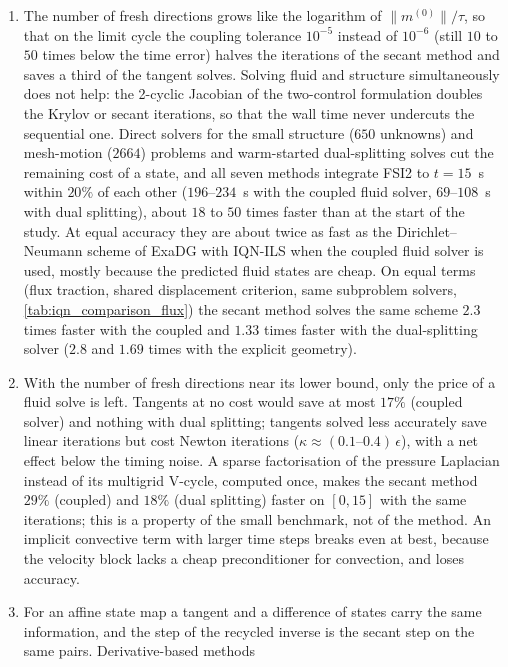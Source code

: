 \documentclass[11pt,a4paper]{article}
\theoremstyle{definition}
\theoremstyle{remark}
\begin{document}
\begin{enumerate}
remaining lever is the price of a direction, i.e.\ of the linear fluid solve of a tangent.
\item The number of fresh directions grows like the logarithm of $\|m^{(0)}\|/\tau$, so that on the
limit cycle the coupling tolerance $10^{-5}$ instead of $10^{-6}$ (still $10$ to $50$ times below
the time error) halves the iterations of the secant method and saves a third of the tangent
solves. Solving fluid and structure simultaneously does not help: the 2-cyclic Jacobian of the
two-control formulation doubles the Krylov or secant iterations, so that the wall time never
undercuts the sequential one. Direct solvers for the small structure ($650$ unknowns) and
mesh-motion ($2664$) problems and warm-started dual-splitting solves cut the remaining cost of a
state, and all seven methods integrate FSI2 to $t=15$~s within $20\%$ of each other ($196$--$234$~s
with the coupled fluid solver, $69$--$108$~s with dual splitting), about $18$ to $50$ times faster
than at the start of the study. At equal accuracy they are about twice as fast as the
Dirichlet--Neumann scheme of ExaDG with IQN-ILS when the coupled fluid solver is used, mostly
because the predicted fluid states are cheap. On equal terms (flux traction, shared displacement
criterion, same subproblem solvers, \cref{tab:iqn_comparison_flux}) the secant method solves the
same scheme $2.3$ times faster with the coupled and $1.33$ times faster with the dual-splitting
solver ($2.8$ and $1.69$ times with the explicit geometry).
\item With the number of fresh directions near its lower bound, only the price of a fluid solve is
left. Tangents at no cost would save at most $17\%$ (coupled solver) and nothing with dual
splitting; tangents solved less accurately save linear iterations but cost Newton iterations
($\kappa\approx(0.1\text{--}0.4)\,\epsilon$), with a net effect below the timing noise. A sparse
factorisation of the pressure Laplacian instead of its multigrid V-cycle, computed once, makes the
secant method $29\%$ (coupled) and $18\%$ (dual splitting) faster on $[0,15]$ with the same
iterations; this is a property of the small benchmark, not of the method. An implicit convective
term with larger time steps breaks even at best, because the velocity block lacks a cheap
preconditioner for convection, and loses accuracy.
\item For an affine state map a tangent and a difference of states carry the same information, and
the step of the recycled inverse is the secant step on the same pairs. Derivative-based methods

\end{enumerate}
\end{document}

